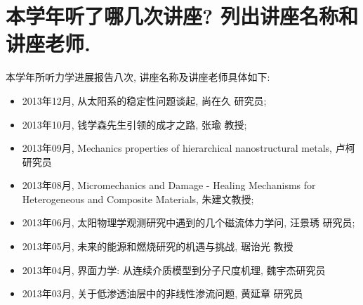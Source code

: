 \documentclass[11pt,a4paper,boxed]{caspset}
\begin{document}

\section{本学年听了哪几次讲座? 列出讲座名称和讲座老师.}
本学年所听力学进展报告八次, 讲座名称及讲座老师具体如下:
\begin{itemize}
\item 2013年12月, 从太阳系的稳定性问题谈起, 尚在久 研究员;
\item 2013年10月, 钱学森先生引领的成才之路, 张瑜 教授;
\item 2013年09月, Mechanics properties of hierarchical nanostructural metals, 卢柯 研究员
\item 2013年08月, Micromechanics and Damage - Healing Mechanisms for Heterogeneous and Composite Materials, 朱建文教授;
\item 2013年06月, 太阳物理学观测研究中遇到的几个磁流体力学问, 汪景琇 研究员;
\item 2013年05月, 未来的能源和燃烧研究的机遇与挑战, 琚诒光 教授
\item 2013年04月, 界面力学: 从连续介质模型到分子尺度机理, 魏宇杰研究员
\item 2013年03月, 关于低渗透油层中的非线性渗流问题, 黄延章 研究员
\end{itemize}
\end{document}

